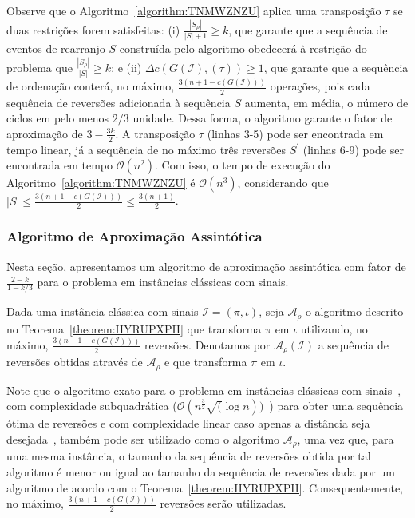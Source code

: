 Observe que o Algoritmo~\ref{algorithm:TNMWZNZU} aplica uma transposição $\tau$ se duas restrições forem satisfeitas: (i) $\frac{|S_{\rho}|}{|S| + 1} \ge k$, que garante que a sequência de eventos de rearranjo $S$ construída pelo algoritmo obedecerá à restrição do problema que $\frac{|S_{\rho}|}{|S|} \ge k$; e (ii) $\Delta c(G(\mathcal{I}), (\tau)) \ge 1$, que garante que a sequência de ordenação conterá, no máximo, $\frac{3(n + 1 -c(G(\mathcal{I})))}{2}$ operações, pois cada sequência de reversões adicionada à sequência $S$ aumenta, em média, o número de ciclos em pelo menos $2/3$ unidade. Dessa forma, o algoritmo garante o fator de aproximação de $3-\frac{3k}{2}$. A transposição $\tau$ (linhas 3-5) pode ser encontrada em tempo linear, já a sequência de no máximo três reversões $S^{\prime}$ (linhas 6-9) pode ser encontrada em tempo $\mathcal{O}(n^2)$. Com isso, o tempo de execução do Algoritmo~\ref{algorithm:TNMWZNZU} é $\mathcal{O}(n^3)$, considerando que $|S| \le \frac{3(n + 1 -c(G(\mathcal{I})))}{2} \le \frac{3({n+1})}{2}$.

\subsubsection{Algoritmo de Aproximação Assintótica}

Nesta seção, apresentamos um algoritmo de aproximação assintótica com fator de $\frac{2-k}{1-k/3}$ para o problema \SbPRT{} em instâncias clássicas com sinais.

\begin{definition}
Dada uma instância clássica com sinais $\mathcal{I} = (\pi,\iota)$, seja $\mathcal{A}_\rho$ o algoritmo descrito no Teorema~\ref{theorem:HYRUPXPH} que transforma $\pi$ em $\iota$ utilizando, no máximo, $\frac{3(n + 1 -c(G(\mathcal{I})))}{2}$ reversões. Denotamos por $\mathcal{A}_\rho(\mathcal{I})$ a sequência de reversões obtidas através de $\mathcal{A}_\rho$ e que transforma $\pi$ em $\iota$.
\end{definition}

Note que o algoritmo exato para o problema \SbR{} em instâncias clássicas com sinais~\cite{1999-hannenhalli-pevzner}, com complexidade subquadrática ($\mathcal{O}(n^{\frac{3}{2}}\sqrt(\log n))$~\cite{2007-tannier-etal}) para obter uma sequência ótima de reversões e com complexidade linear caso apenas a distância seja desejada~\cite{2001-bader-etal}, também pode ser utilizado como o algoritmo $\mathcal{A}_\rho$, uma vez que, para uma mesma instância, o tamanho da sequência de reversões obtida por tal algoritmo é menor ou igual ao tamanho da sequência de reversões dada por um algoritmo de acordo com o Teorema~\ref{theorem:HYRUPXPH}. Consequentemente, no máximo, $\frac{3(n + 1 -c(G(\mathcal{I})))}{2}$ reversões serão utilizadas.


